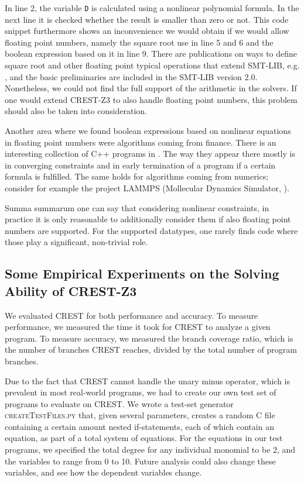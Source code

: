 \documentclass[oribibl, twocolumn]{llncs}
\begin{document}
In line 2, the variable \texttt{D} is calculated using a nonlinear polynomial
formula. In the next line it is checked whether the result is smaller
than zero or not.
This code snippet furthermore shows an inconvenience we would obtain
if we would allow floating point numbers, namely the square root use
in line 5 and 6 and the boolean expression based on it in line 9. There are publications on ways to define square root and other
floating point typical operations that extend \textsc{SMT-LIB},
e.g. \cite{rummer2010smt}, and the basic preliminaries are included in
the \textsc{SMT-LIB} version 2.0. Nonetheless, we could not find the
full support of the arithmetic in the solvers. If one would extend
\textsc{CREST-Z3} to also handle floating point numbers, this problem
should also be taken into consideration.

Another area where we found boolean expressions based on nonlinear equations in floating point numbers were algorithms coming from finance. There is an interesting collection of \textsc{C++} programs in \cite{odegaard2003financial}. The way they appear there mostly is in converging constraints and in early termination of a program if a certain formula is fulfilled. The same holds for algorithms coming from numerics; consider for example the project \textsc{LAMMPS} (Mollecular Dynamics Simulator, \cite{plimpton2007lammps}).

Summa summarum one can say that considering nonlinear constraints, in practice it is only reasonable to additionally consider them if also floating point numbers are supported. For the supported datatypes, one rarely finds code where those play a significant, non-trivial role.

\subsection{Some Empirical Experiments on the Solving Ability of \textsc{CREST-Z3}}
We evaluated CREST for both performance and accuracy. To measure performance, we measured the time it took for CREST to analyze a given program. To measure accuracy, we measured the branch coverage ratio, which is the number of branches CREST reaches, divided by the total number of program branches.

Due to the fact that CREST cannot handle the unary minus operator, which is prevalent in most real-world programs, we had to create our own test set of programs to evaluate on CREST. We wrote a test-set generator \textsc{createTestFiles.py} that, given several parameters, creates a random C file containing a certain amount nested if-statements, each of which contain an equation, as part of a total system of equations. For the equations in our test programs, we specified the total degree for any individual monomial to be 2, and the variables to range from 0 to 10. Future analysis could also change these variables, and see how the dependent variables change.
\end{document}
